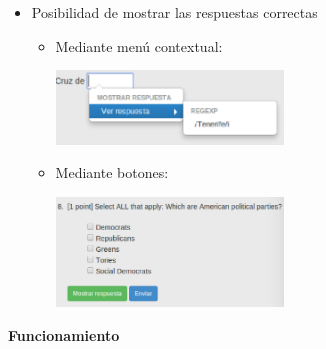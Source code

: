 \documentclass{beamer}
\begin{document}
\begin{frame}[allowframebreaks]
\begin{itemize}
    \item Posibilidad de mostrar las respuestas correctas
    \bigskip
    \begin{itemize}
      \item Mediante menú contextual:
      \begin{center}
        \includegraphics[width=0.5\textwidth]{img/show_answer.eps}
      \end{center}
      \item Mediante botones:
      \begin{center}
        \includegraphics[width=0.5\textwidth]{img/sm.eps}
      \end{center}  
    \end{itemize}
    
  \end{itemize}
  \framebreak
  
  {\bfseries {\Large Funcionamiento}}
  \bigskip  
  \bigskip
  

\end{frame}
\end{document}
